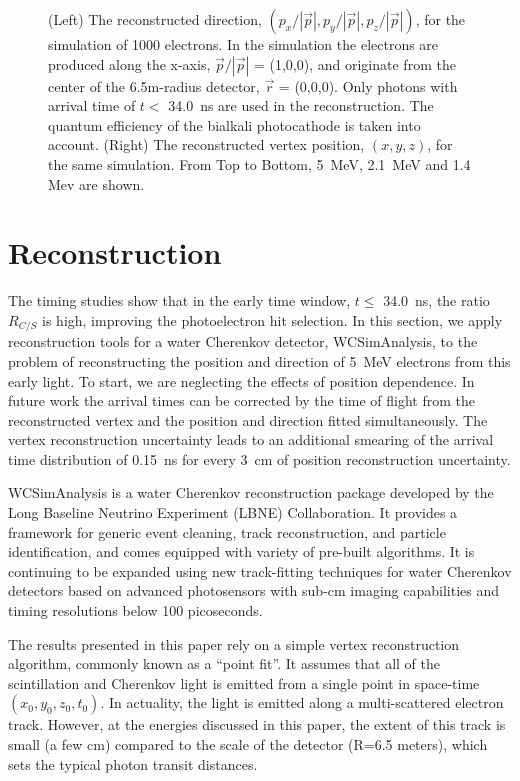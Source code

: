 \documentclass[cits]{JINST}
\begin{document}
\begin{figure}[tbh]
\begin{center}
        \caption[]{\label{fig:reco} (Left) The reconstructed direction,
        $(p_x/|\vec{p}|, p_y/|\vec{p}|,
        p_z/|\vec{p}|)$, for the simulation of 1000 electrons. In the simulation the electrons are produced along the
        x-axis, $\vec{p}/|\vec{p}|$ = (1,0,0), and originate
        from the center of the 6.5m-radius detector, $\vec{r}$ =
        (0,0,0). Only photons with arrival time of $t<$ 34.0~ns are used
        in the reconstruction. The quantum efficiency of the bialkali
        photocathode is taken into account. (Right) The reconstructed
        vertex position, $(x,y,z)$, for the same simulation. From Top to Bottom, 5~MeV, 2.1~MeV and 1.4 Mev are shown.}
\end{center}
\end{figure}

\section{Reconstruction}
\label{reconstruction_sec}

The timing studies show that in the early time window, $t\leq$
34.0~ns, the ratio $R_{C/S}$ is high, improving the photoelectron hit selection. In this section, we apply
reconstruction tools for a water Cherenkov detector, WCSimAnalysis,
to the problem of reconstructing the position and direction of 5~MeV
electrons from this early light. To start, we are neglecting the effects of position dependence. In future work the arrival times can be corrected by the time of flight from the reconstructed vertex and the position and direction fitted simultaneously. The vertex reconstruction uncertainty leads to an additional smearing of the arrival time distribution of 0.15~ns for every 3~cm of position reconstruction uncertainty.

WCSimAnalysis is a water Cherenkov
reconstruction package developed by the Long Baseline Neutrino
Experiment (LBNE) Collaboration\cite{Blake}. It provides a framework
for generic event cleaning, track reconstruction, and particle
identification, and comes equipped with variety of pre-built
algorithms. It is continuing to be expanded using new track-fitting
techniques for water Cherenkov detectors\cite{Sanchez2012525} based on
advanced photosensors with sub-cm imaging capabilities and timing
resolutions below 100 picoseconds.

The results presented in this paper rely on a simple vertex
reconstruction algorithm, commonly known as a ``point
fit''\cite{SuperKalgo}. It assumes that all of the scintillation and
Cherenkov light is emitted from a single point in space-time
$(x_0,y_0,z_0,t_0)$. In actuality, the light is emitted along a multi-scattered electron track. However, at the energies
discussed in this paper, the extent of this track is small (a few cm)
compared to the scale of the detector (R=6.5 meters), which sets the typical
photon transit distances.
\end{document}
